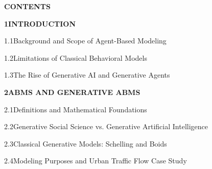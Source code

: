 \documentclass[12pt,a4paper]{report}
\begin{document}
\clearpage


\clearpage
\thispagestyle{plain}
\begin{center}
{\fontsize{18}{22}\selectfont\bfseries CONTENTS}\par
\end{center}
\vspace{0.8cm}

\noindent\textbf{1\quad INTRODUCTION}\dotfill\textbf{\pageref{chap:intro}}\par
\vspace{3pt}
\noindent\hspace{0.3in}1.1\quad Background and Scope of Agent-Based Modeling\dotfill\pageref{sec:background}\par
\vspace{2pt}
\noindent\hspace{0.3in}1.2\quad Limitations of Classical Behavioral Models\dotfill\pageref{sec:limitations}\par
\vspace{2pt}
\noindent\hspace{0.3in}1.3\quad The Rise of Generative AI and Generative Agents\dotfill\pageref{sec:genai_shift}\par
\vspace{6pt}

\noindent\textbf{2\quad ABMS AND GENERATIVE ABMS}\dotfill\textbf{\pageref{chap:abms_and_gabms}}\par
\vspace{3pt}
\noindent\hspace{0.3in}2.1\quad Definitions and Mathematical Foundations\dotfill\pageref{sec:math_foundations}\par
\vspace{2pt}
\noindent\hspace{0.3in}2.2\quad Generative Social Science vs. Generative Artificial Intelligence\dotfill\pageref{sec:epistemology}\par
\vspace{2pt}
\noindent\hspace{0.3in}2.3\quad Classical Generative Models: Schelling and Boids\dotfill\pageref{sec:classic_models}\par
\vspace{2pt}
\noindent\hspace{0.3in}2.4\quad Modeling Purposes and Urban Traffic Flow Case Study\dotfill\pageref{sec:traffic_case}\par
\vspace{6pt}
\end{document}
